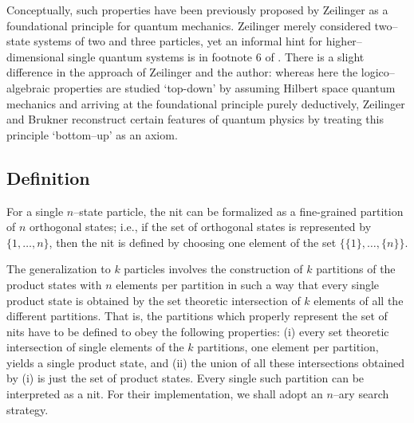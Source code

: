 \documentclass{article}
\begin{document}
Conceptually, such properties have been previously proposed
by Zeilinger \cite{zeil-99} as a
foundational principle for quantum mechanics.
Zeilinger merely considered two--state systems of two and three particles,
yet an informal hint for higher--dimensional single quantum systems
is in  footnote 6 of \cite[p. 635]{zeil-99}.
There is a slight difference in the approach of Zeilinger and the author:
whereas here the logico--algebraic properties are studied `top-down' by assuming
Hilbert space quantum mechanics and arriving at the foundational principle
purely deductively,
Zeilinger and Brukner \cite{zeil-bruk-02}
reconstruct certain features of quantum physics by treating this  principle `bottom--up'
as an axiom.

\subsection{Definition}


For a single $n$--state particle, the nit can be formalized as a fine-grained partition
of $n$ orthogonal states; i.e.,
if the set of orthogonal states is represented by $\{1,\ldots ,n\}$,
then the nit is defined by choosing one element of the set
$
\{\{1\} ,\ldots ,\{n\}\}
$.

The generalization to $k$ particles involves the construction of
$k$ partitions of the product states with
$n$ elements per partition in such a way that
every single product state is obtained by the set theoretic intersection of
$k$ elements of all the different partitions.
That is, the partitions which properly represent the set of nits
have to be defined to obey the following properties:
(i) every set theoretic intersection of single elements of the $k$ partitions,
one element per partition, yields a single product state,
and
(ii) the union of all these
intersections obtained by (i) is just the set of product states.
Every single such partition can be interpreted as a nit.
For their implementation, we shall adopt an $n$--ary search strategy.

\end{document}
